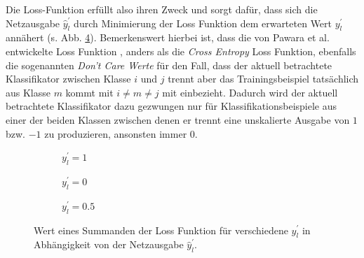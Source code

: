 Die Loss-Funktion erfüllt also ihren Zweck und sorgt dafür, dass sich die Netzausgabe $\widehat{y}_{l}^{'}$ durch Minimierung der Loss Funktion dem erwarteten Wert $y_{l}^{'}$ annähert (s. Abb. \ref{fig:OvOLoss}). Bemerkenswert hierbei ist, dass die von Pawara et al. entwickelte Loss Funktion \cite{pawaraPaper}, anders als die \textit{Cross Entropy} Loss Funktion, ebenfalls die sogenannten \textit{Don't Care Werte} für den Fall, dass der aktuell betrachtete Klassifikator zwischen Klasse $i$ und $j$ trennt aber das Trainingsbeispiel tatsächlich aus Klasse $m$ kommt mit $i\neq m \neq j$ mit einbezieht. Dadurch wird der aktuell betrachtete Klassifikator dazu gezwungen nur für Klassifikationsbeispiele aus einer der beiden Klassen zwischen denen er trennt eine unskalierte Ausgabe von $1$ bzw. $-1$ zu produzieren, ansonsten immer $0$.

\begin{figure}[H]
\centering
\begin{subfigure}{.3\textwidth}
\begin{adjustbox}{width=\textwidth, center}

\end{adjustbox}
\caption{$y_l^{'}=1$}
\label{fig:OvOLoss-y1}
\end{subfigure}
\begin{subfigure}{.3\textwidth}
\begin{adjustbox}{width=\textwidth, center}

\end{adjustbox}
\caption{$y_l^{'}=0$}
\label{fig:OvOLoss-y0}
\end{subfigure}
\begin{subfigure}{.3\textwidth}
\begin{adjustbox}{width=\textwidth, center}

\end{adjustbox}
\caption{$y_l^{'}=0.5$}
\label{fig:OvOLoss-y05}
\end{subfigure}
\caption{Wert eines Summanden der Loss Funktion für verschiedene $y_l^{'}$ in Abhängigkeit von der Netzausgabe $\widehat{y}_l^{'}$.}
\label{fig:OvOLoss}
\end{figure}

